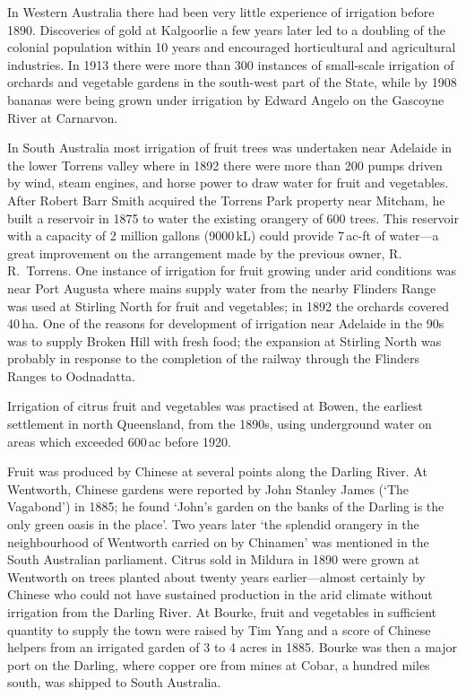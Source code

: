 In Western Australia there had been very little experience of
irrigation before 1890.  Discoveries of gold at Kalgoorlie a few years
later led to a doubling of the colonial population within 10 years and
encouraged horticultural and agricultural industries.  In 1913 there
were more than 300 instances of small-scale irrigation of orchards and
vegetable gardens in the south-west part of the State, while by 1908
bananas were being grown under irrigation by Edward Angelo on the
Gascoyne River at Carnarvon.

In South Australia most irrigation of fruit trees was undertaken near
Adelaide in the lower Torrens valley where in 1892 there were more
than 200 pumps driven by wind, steam engines, and horse power to draw
water for fruit and vegetables.  After Robert Barr Smith acquired the
Torrens Park property near Mitcham, he built a reservoir in 1875 to
water the existing orangery of 600 trees.  This reservoir with a
capacity of 2 million gallons (9000\,kL) could provide 7\,ac-ft of
water---a great improvement on the arrangement made by the previous
owner, R.\,R.~Torrens.  One instance of irrigation for fruit growing
under arid conditions was near Port Augusta where mains supply water
from the nearby Flinders Range was used at Stirling North for fruit
and vegetables; in 1892 the orchards covered 40\,ha.  One of the
reasons for development of irrigation near Adelaide in the 90s was to
supply Broken Hill with fresh food; the expansion at Stirling North
was probably in response to the completion of the railway through the
Flinders Ranges to Oodnadatta.

Irrigation of citrus fruit and vegetables was practised at Bowen, the
earliest settlement in north Queensland, from the 1890s, using
underground water on areas which exceeded 600\,ac before
1920.

Fruit was produced by Chinese at several points along the Darling
River.  At Wentworth, Chinese gardens were reported by John Stanley
James (`The Vagabond') in 1885; he found `John's garden on the banks
of the Darling is the only green oasis in the place'. Two years later
`the splendid orangery in the neighbourhood of Wentworth carried on by
Chinamen' was mentioned in the South Australian parliament.  Citrus
sold in Mildura in 1890 were grown at Wentworth on trees planted about
twenty years earlier---almost certainly by Chinese who could not have
sustained production in the arid climate without irrigation from the
Darling River.  At Bourke, fruit and vegetables in sufficient quantity
to supply the town were raised by Tim Yang and a score of Chinese
helpers from an irrigated garden of 3 to 4 acres in 1885.  Bourke was
then a major port on the Darling, where copper ore from mines at
Cobar, a hundred miles south, was shipped to South
Australia.

